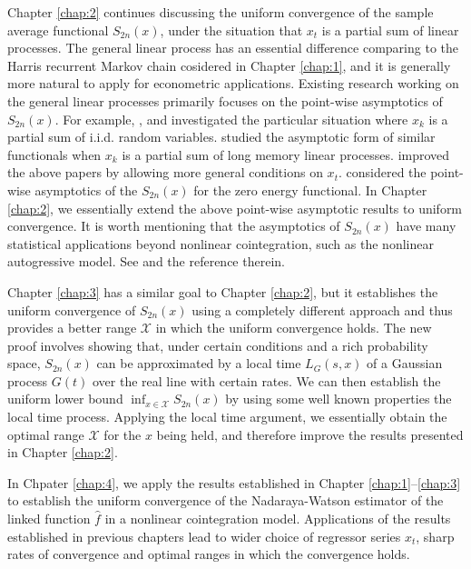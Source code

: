 Chapter \ref{chap:2} continues discussing the uniform convergence of the sample average functional $S_{2n}(x)$, under the situation that $x_t$ is a partial sum of linear processes. The general linear process has an essential difference comparing to the Harris recurrent Markov chain cosidered in Chapter \ref{chap:1}, and it is generally more natural to apply for econometric applications. Existing research working on the general linear processes primarily focuses on the point-wise asymptotics of $S_{2n}(x)$. For example, \cite{borodinibragimov1995}, \cite{akonom1993} and \cite{phillipspark1998} investigated the particular situation where $x_{k}$ is a partial sum of i.i.d. random variables. \cite{jeganathan2004} studied the asymptotic form of similar functionals when $x_{k}$ is a partial sum of long memory linear processes. \cite{wangphillips2010a} improved the above papers by allowing more general conditions on $x_t$.  \cite{wangphillips2010b} considered the point-wise asymptotics of the $S_{2n}(x)$ for the zero energy functional.  In Chapter \ref{chap:2}, we essentially extend the above point-wise asymptotic results to uniform convergence. It is worth mentioning that the asymptotics of $S_{2n}(x)$ have many statistical applications beyond nonlinear cointegration, such as the nonlinear autogressive model. See \citet[][\citeyear{wangphillips2010b}]{wangphillips2012} and the reference therein.


Chapter \ref{chap:3} has a similar goal to Chapter \ref{chap:2}, but it establishes the uniform convergence of $S_{2n}(x)$ using a completely different approach and thus provides a better range $\mathcal X$ in which the uniform convergence holds. The new proof involves showing that, under certain conditions and a rich probability space, $S_{2n}(x)$ can be approximated by a local time $L_G(s, x)$ of a Gaussian process $G(t)$ over the real line with certain rates.  We can then establish the uniform lower bound $\inf_{x \in \mathcal X} S_{2n}(x)$ by using some well known properties the local time process. Applying the local time argument, we essentially obtain the optimal range $\mathcal{X}$ for the $x$ being held, and therefore improve the results presented in Chapter \ref{chap:2}.

In Chpater \ref{chap:4}, we apply the results established in Chapter \ref{chap:1}--\ref{chap:3} to establish the uniform convergence of the Nadaraya-Watson estimator of the linked function $\widehat{f}$ in a nonlinear cointegration model. Applications of the results established in previous chapters lead to wider choice of regressor series $x_t$, sharp rates of convergence and optimal ranges in which the convergence holds. 

